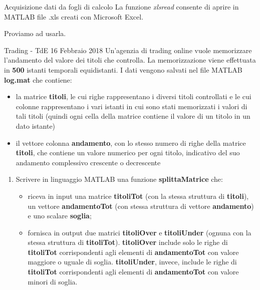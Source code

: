 
\begin{frame}{Acquisizione dati da fogli di calcolo}
    La funzione \emph{xlsread} consente di aprire in MATLAB file .xls creati con Microsoft Excel.

    Proviamo ad usarla.
\end{frame}

\begin{frame}[allowframebreaks]{Trading - TdE 16 Febbraio 2018}
    Un’agenzia di trading online vuole memorizzare l’andamento del valore dei titoli che controlla.
    La memorizzazione viene effettuata in \textbf{500} istanti temporali equidistanti.
    I dati vengono salvati nel file MATLAB \textbf{log.mat} che contiene:
    \begin{itemize}
        \item la matrice \textbf{titoli}, le cui righe rappresentano i diversi titoli controllati e le cui colonne rappresentano i vari istanti in cui sono stati memorizzati i valori di tali titoli (quindi ogni cella della matrice contiene il valore di un titolo in un dato istante)
        \item il vettore colonna \textbf{andamento}, con lo stesso numero di righe della matrice \textbf{titoli}, che contiene un valore numerico per ogni titolo, indicativo del suo andamento complessivo crescente o decrescente
    \end{itemize}

    \framebreak
    \begin{enumerate}
        \item Scrivere in linguaggio MATLAB una funzione \textbf{splittaMatrice} che:
            \begin{itemize}
                \item riceva in input una matrice \textbf{titoliTot} (con la stessa struttura di \textbf{titoli}), un vettore \textbf{andamentoTot} (con stessa struttura di vettore \textbf{andamento}) e uno scalare \textbf{soglia};
                \item fornisca in output due matrici \textbf{titoliOver} e \textbf{titoliUnder} (ognuna con la stessa struttura di \textbf{titoliTot}). \textbf{titoliOver} include solo le righe di \textbf{titoliTot} corrispondenti agli elementi di \textbf{andamentoTot} con valore maggiore o uguale di soglia. \textbf{titoliUnder}, invece, include le righe di \textbf{titoliTot} corrispondenti agli elementi di \textbf{andamentoTot} con valore minori di soglia.
            \end{itemize}


\end{enumerate}
\end{frame}
